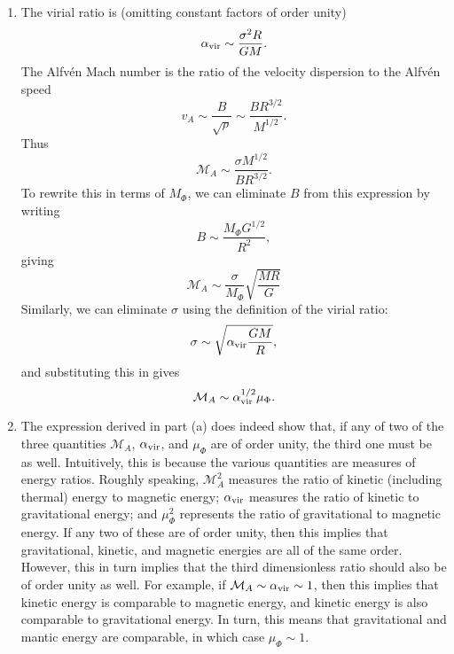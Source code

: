 \begin{enumerate}
\begin{enumerate}
\item The virial ratio is (omitting constant factors of order unity)
\begin{displaymath}
\alpha_{\rm vir}\sim \frac{\sigma^2 R}{G M}.
\end{displaymath}
The Alfv\'en Mach number is the ratio of the velocity dispersion to the Alfv\'en speed
\begin{displaymath}
v_A \sim \frac{B}{\sqrt{\rho}} \sim \frac{B R^{3/2}}{M^{1/2}}.
\end{displaymath}
Thus
\begin{displaymath}
\mathcal{M}_A \sim \frac{\sigma M^{1/2}}{B R^{3/2}}.
\end{displaymath}
To rewrite this in terms of $M_\Phi$, we can eliminate $B$ from this expression by writing
\begin{displaymath}
B \sim \frac{M_\Phi G^{1/2}}{R^2},
\end{displaymath}
giving
\begin{displaymath}
\mathcal{M}_A \sim \frac{\sigma}{M_\Phi} \sqrt{\frac{MR}{G}}
\end{displaymath}
Similarly, we can eliminate $\sigma$ using the definition of the virial ratio:
\begin{displaymath}
\sigma \sim \sqrt{\alpha_{\rm vir}\frac{G M}{R}},
\end{displaymath}
and substituting this in gives
\begin{displaymath}
\mathcal{M}_A \sim \alpha_{\rm vir}^{1/2} \mu_\Phi.
\end{displaymath}

\item The expression derived in part (a) does indeed show that, if any of two of the three quantities $\mathcal{M}_A$, $\alpha_{\rm vir}$, and $\mu_\Phi$ are of order unity, the third one must be as well. Intuitively, this is because the various quantities are measures of energy ratios. Roughly speaking, $\mathcal{M}_A^2$ measures the ratio of kinetic (including thermal) energy to magnetic energy; $\alpha_{\rm vir}$ measures the ratio of kinetic to gravitational energy; and $\mu_\Phi^2$ represents the ratio of gravitational to magnetic energy. If any two of these are of order unity, then this implies that gravitational, kinetic, and magnetic energies are all of the same order. However, this in turn implies that the third dimensionless ratio should also be of order unity as well. For example, if $\mathcal{M}_A \sim \alpha_{\rm vir} \sim 1$, then this implies that kinetic energy is comparable to magnetic energy, and kinetic energy is also comparable to gravitational energy. In turn, this means that gravitational and mantic energy are comparable, in which case $\mu_\Phi \sim 1$.


\end{enumerate}
\end{enumerate}
